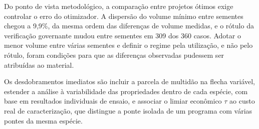 Do ponto de vista metodológico, a comparação entre projetos ótimos exige controlar o erro do otimizador. A dispersão do volume mínimo entre sementes chegou a 9,9\%, da mesma ordem das diferenças de volume medidas, e o rótulo da verificação governante mudou entre sementes em 309 dos 360 casos. Adotar o menor volume entre várias sementes e definir o regime pela utilização, e não pelo rótulo, foram condições para que as diferenças observadas pudessem ser atribuídas ao material.

Os desdobramentos imediatos são incluir a parcela de multidão na flecha variável, estender a análise à variabilidade das propriedades dentro de cada espécie, com base em resultados individuais de ensaio, e associar o limiar econômico $\tau$ ao custo real de caracterização, que distingue a ponte isolada de um programa com várias pontes da mesma espécie.
